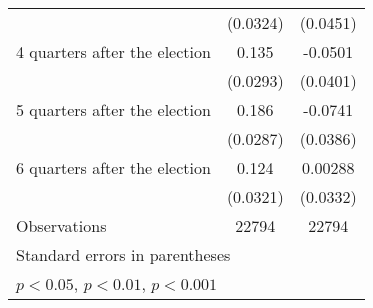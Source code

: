 \begin{table}[htbp]
\begin{tabular}{l*{2}{c}}
                    &    (0.0324)         &    (0.0451)         \\
[1em]
 4 quarters after the election&       0.135\sym{***}&     -0.0501         \\
                    &    (0.0293)         &    (0.0401)         \\
[1em]
 5 quarters after the election&       0.186\sym{***}&     -0.0741         \\
                    &    (0.0287)         &    (0.0386)         \\
[1em]
 6 quarters after the election&       0.124\sym{***}&     0.00288         \\
                    &    (0.0321)         &    (0.0332)         \\
\hline
Observations        &       22794         &       22794         \\
\hline\hline
\multicolumn{3}{l}{\footnotesize Standard errors in parentheses}\\
\multicolumn{3}{l}{\footnotesize \sym{*} \(p<0.05\), \sym{**} \(p<0.01\), \sym{***} \(p<0.001\)}\\
\end{tabular}
\end{table}
